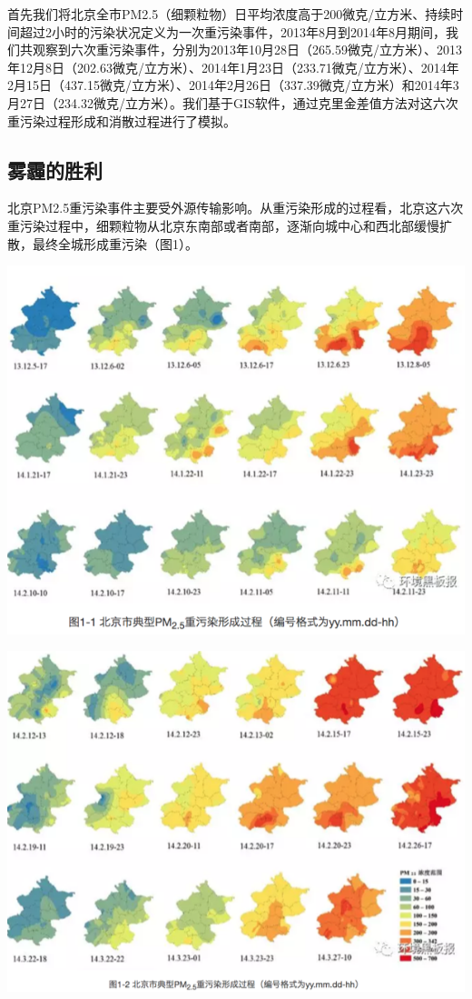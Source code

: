 \documentclass[]{book}
\begin{document}
首先我们将北京全市PM2.5（细颗粒物）日平均浓度高于200微克/立方米、持续时间超过2小时的污染状况定义为一次重污染事件，2013年8月到2014年8月期间，我们共观察到六次重污染事件，分别为2013年10月28日（265.59微克/立方米）、2013年12月8日（202.63微克/立方米）、2014年1月23日（233.71微克/立方米）、2014年2月15日（437.15微克/立方米）、2014年2月26日（337.39微克/立方米）和2014年3月27日（234.32微克/立方米）。我们基于GIS软件，通过克里金差值方法对这六次重污染过程形成和消散过程进行了模拟。

\subsection{雾霾的胜利}

北京PM2.5重污染事件主要受外源传输影响。从重污染形成的过程看，北京这六次重污染过程中，细颗粒物从北京东南部或者南部，逐渐向城中心和西北部缓慢扩散，最终全城形成重污染（图1）。

\includegraphics[width=8.33in]{images/windhaze1}

\includegraphics[width=8.33in]{images/windhaze2}
\end{document}
